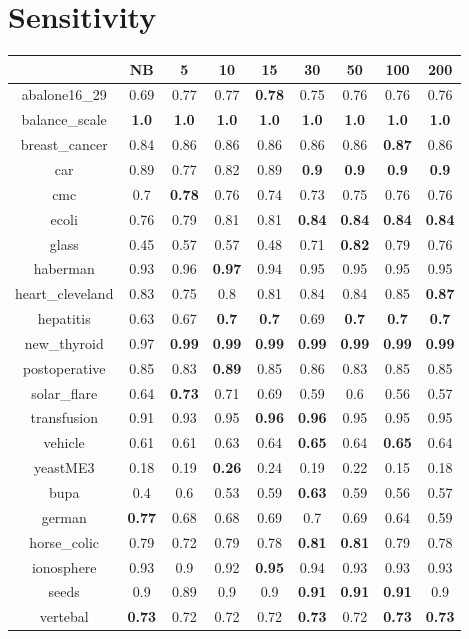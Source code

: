 \documentclass{article}%
\begin{document}
%
\section*{Sensitivity}%
\begin{tabular}{c|cccccccc}%
\hline%
&NB&5&10&15&30&50&100&200\\%
\hline%
abalone16\_29&0.69&0.77&0.77&\textbf{0.78}&0.75&0.76&0.76&0.76\\%
\hline%
balance\_scale&\textbf{1.0}&\textbf{1.0}&\textbf{1.0}&\textbf{1.0}&\textbf{1.0}&\textbf{1.0}&\textbf{1.0}&\textbf{1.0}\\%
\hline%
breast\_cancer&0.84&0.86&0.86&0.86&0.86&0.86&\textbf{0.87}&0.86\\%
\hline%
car&0.89&0.77&0.82&0.89&\textbf{0.9}&\textbf{0.9}&\textbf{0.9}&\textbf{0.9}\\%
\hline%
cmc&0.7&\textbf{0.78}&0.76&0.74&0.73&0.75&0.76&0.76\\%
\hline%
ecoli&0.76&0.79&0.81&0.81&\textbf{0.84}&\textbf{0.84}&\textbf{0.84}&\textbf{0.84}\\%
\hline%
glass&0.45&0.57&0.57&0.48&0.71&\textbf{0.82}&0.79&0.76\\%
\hline%
haberman&0.93&0.96&\textbf{0.97}&0.94&0.95&0.95&0.95&0.95\\%
\hline%
heart\_cleveland&0.83&0.75&0.8&0.81&0.84&0.84&0.85&\textbf{0.87}\\%
\hline%
hepatitis&0.63&0.67&\textbf{0.7}&\textbf{0.7}&0.69&\textbf{0.7}&\textbf{0.7}&\textbf{0.7}\\%
\hline%
new\_thyroid&0.97&\textbf{0.99}&\textbf{0.99}&\textbf{0.99}&\textbf{0.99}&\textbf{0.99}&\textbf{0.99}&\textbf{0.99}\\%
\hline%
postoperative&0.85&0.83&\textbf{0.89}&0.85&0.86&0.83&0.85&0.85\\%
\hline%
solar\_flare&0.64&\textbf{0.73}&0.71&0.69&0.59&0.6&0.56&0.57\\%
\hline%
transfusion&0.91&0.93&0.95&\textbf{0.96}&\textbf{0.96}&0.95&0.95&0.95\\%
\hline%
vehicle&0.61&0.61&0.63&0.64&\textbf{0.65}&0.64&\textbf{0.65}&0.64\\%
\hline%
yeastME3&0.18&0.19&\textbf{0.26}&0.24&0.19&0.22&0.15&0.18\\%
\hline%
bupa&0.4&0.6&0.53&0.59&\textbf{0.63}&0.59&0.56&0.57\\%
\hline%
german&\textbf{0.77}&0.68&0.68&0.69&0.7&0.69&0.64&0.59\\%
\hline%
horse\_colic&0.79&0.72&0.79&0.78&\textbf{0.81}&\textbf{0.81}&0.79&0.78\\%
\hline%
ionosphere&0.93&0.9&0.92&\textbf{0.95}&0.94&0.93&0.93&0.93\\%
\hline%
seeds&0.9&0.89&0.9&0.9&\textbf{0.91}&\textbf{0.91}&\textbf{0.91}&0.9\\%
\hline%
vertebal&\textbf{0.73}&0.72&0.72&0.72&\textbf{0.73}&0.72&\textbf{0.73}&\textbf{0.73}\\%
\hline%
\end{tabular}
\end{document}
